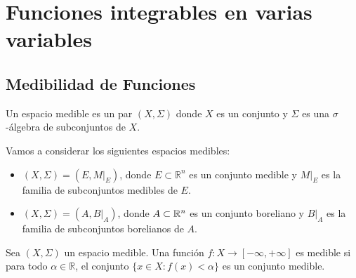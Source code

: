 \section{Funciones integrables en varias variables}

\subsection{Medibilidad de Funciones}

\begin{definición}
Un espacio medible es un par $(X, \Sigma)$ donde $X$ es un conjunto y $\Sigma$ es una $\sigma$-álgebra de subconjuntos de $X$.
\end{definición}
Vamos a considerar los siguientes espacios medibles:

\begin{itemize}
    \item $(X, \Sigma) = (E, M|_E)$, donde $E \subset \mathbb{R}^n$ es un conjunto medible y $M|_E$ es la familia de subconjuntos medibles de $E$.
    \item $(X, \Sigma) = (A, B|_A)$, donde $A \subset \mathbb{R}^n$ es un conjunto boreliano y $B|_A$ es la familia de subconjuntos borelianos de $A$.
\end{itemize}

\begin{definición}
Sea $(X, \Sigma)$ un espacio medible. Una función $f: X \to [-\infty, +\infty]$ es medible si para todo $\alpha \in \mathbb{R}$, el conjunto $\{x \in X : f(x) < \alpha\}$ es un conjunto medible.
\end{definición}


